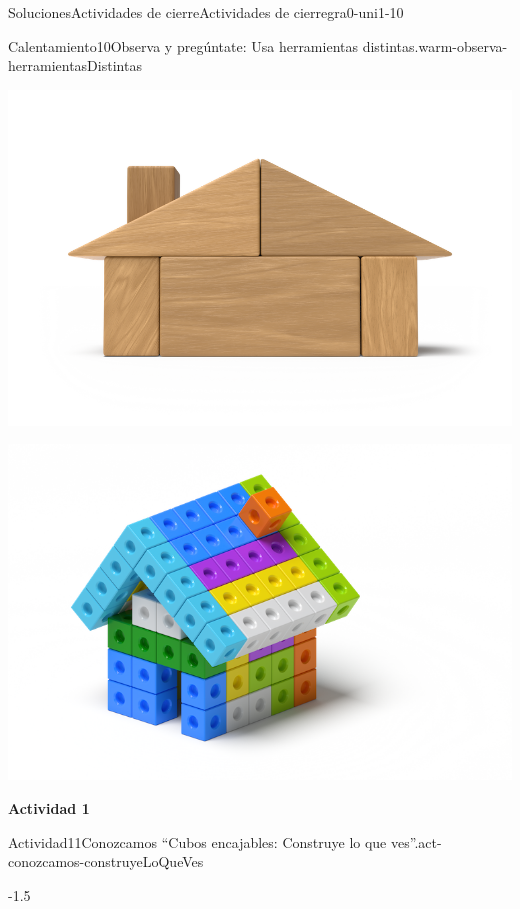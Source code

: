 \documentclass[twoside,10pt,]{article}
\begin{document}
\begin{solutions-section}{Soluciones}{Actividades de cierre}{}{Actividades de cierre}{}{}{gra0-uni1-10}
\begin{explorationsolution}{Calentamiento}{10}{Observa y pregúntate: Usa herramientas distintas.}{warm-observa-herramientasDistintas}
\begin{sidebyside}{2}{0.05}{0.05}{0.1}
\begin{sbspanel}{0.4}
\includegraphics[width=\linewidth]{external/png-source/K.1.A Beta Student Workbook.Woodhouse_withShadow.png}
\par
\includegraphics[width=\linewidth]{external/png-source/5.1.A2.House_withShadow.png}
\end{sbspanel}%
\end{sidebyside}%
\end{explorationsolution}%
\par\medskip
\noindent\textbf{\large{}\space\textperiodcentered\space{}Actividad 1}
\begin{activitysolution}{Actividad}{11}{Conozcamos “Cubos encajables: Construye lo que ves”.}{act-conozcamos-construyeLoQueVes}%
\begin{image}{0}{1}{0}{-1.5\baselineskip}%

\end{image}
\end{activitysolution}
\end{solutions-section}
\end{document}
